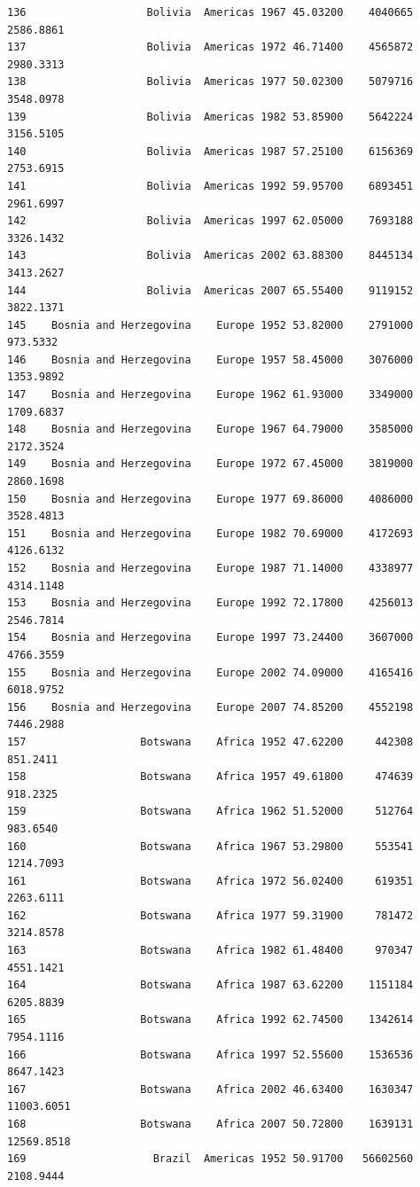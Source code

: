 \documentclass[
  letterpaper,
  DIV=11,
  numbers=noendperiod]{scrreprt}
\begin{document}
\begin{verbatim}
136                   Bolivia  Americas 1967 45.03200    4040665   2586.8861
137                   Bolivia  Americas 1972 46.71400    4565872   2980.3313
138                   Bolivia  Americas 1977 50.02300    5079716   3548.0978
139                   Bolivia  Americas 1982 53.85900    5642224   3156.5105
140                   Bolivia  Americas 1987 57.25100    6156369   2753.6915
141                   Bolivia  Americas 1992 59.95700    6893451   2961.6997
142                   Bolivia  Americas 1997 62.05000    7693188   3326.1432
143                   Bolivia  Americas 2002 63.88300    8445134   3413.2627
144                   Bolivia  Americas 2007 65.55400    9119152   3822.1371
145    Bosnia and Herzegovina    Europe 1952 53.82000    2791000    973.5332
146    Bosnia and Herzegovina    Europe 1957 58.45000    3076000   1353.9892
147    Bosnia and Herzegovina    Europe 1962 61.93000    3349000   1709.6837
148    Bosnia and Herzegovina    Europe 1967 64.79000    3585000   2172.3524
149    Bosnia and Herzegovina    Europe 1972 67.45000    3819000   2860.1698
150    Bosnia and Herzegovina    Europe 1977 69.86000    4086000   3528.4813
151    Bosnia and Herzegovina    Europe 1982 70.69000    4172693   4126.6132
152    Bosnia and Herzegovina    Europe 1987 71.14000    4338977   4314.1148
153    Bosnia and Herzegovina    Europe 1992 72.17800    4256013   2546.7814
154    Bosnia and Herzegovina    Europe 1997 73.24400    3607000   4766.3559
155    Bosnia and Herzegovina    Europe 2002 74.09000    4165416   6018.9752
156    Bosnia and Herzegovina    Europe 2007 74.85200    4552198   7446.2988
157                  Botswana    Africa 1952 47.62200     442308    851.2411
158                  Botswana    Africa 1957 49.61800     474639    918.2325
159                  Botswana    Africa 1962 51.52000     512764    983.6540
160                  Botswana    Africa 1967 53.29800     553541   1214.7093
161                  Botswana    Africa 1972 56.02400     619351   2263.6111
162                  Botswana    Africa 1977 59.31900     781472   3214.8578
163                  Botswana    Africa 1982 61.48400     970347   4551.1421
164                  Botswana    Africa 1987 63.62200    1151184   6205.8839
165                  Botswana    Africa 1992 62.74500    1342614   7954.1116
166                  Botswana    Africa 1997 52.55600    1536536   8647.1423
167                  Botswana    Africa 2002 46.63400    1630347  11003.6051
168                  Botswana    Africa 2007 50.72800    1639131  12569.8518
169                    Brazil  Americas 1952 50.91700   56602560   2108.9444

\end{verbatim}
\end{document}

